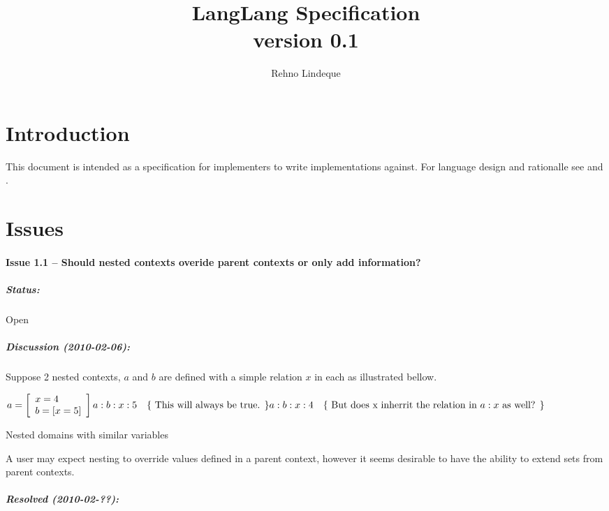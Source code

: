 \documentclass[11pt]{article}
\begin{document}
\title{LangLang Specification\\\small{version 0.1}}
\author{Rehno Lindeque}

\maketitle

\tableofcontents

\section{Introduction}
This document is intended as a specification for implementers to write implementations against. For language design and rationalle see \cite{ctxfoundation} and \cite{ctxrationalle}.

\section{Issues}

\paragraph{Issue 1.1 -- Should nested contexts overide parent contexts or only add information?}

\subparagraph{Status:} Open

\subparagraph{Discussion (2010-02-06):}
Suppose 2 nested contexts, $a$ and $b$ are defined with a simple relation $x$ in each as illustrated bellow.
\begin{example}[H]
$
  a = \left [ \begin{array}{l}
    x = 4 \\
    b = [x = 5]
  \end{array} \right ] \\\\
  a:b:x:5 \text{\quad\{ This will always be true. \}} \\
  a:b:x:4 \text{\quad\{ But does x inherrit the relation in $a:x$ as well? \}}
$
\caption{Nested domains with similar variables}
\end{example}

A user may expect nesting to override values defined in a parent context, however it seems desirable to have the ability to extend sets from parent contexts.

\subparagraph{Resolved (2010-02-??):}

\listoftables

\listoffigures



\end{document}
